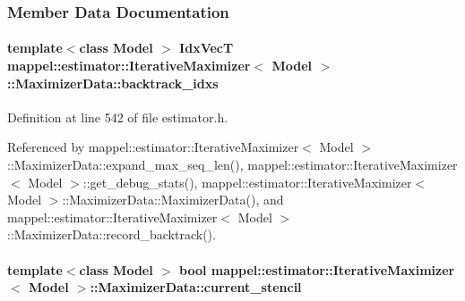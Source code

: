 \subsubsection{Member Data Documentation}
\paragraph[{\texorpdfstring{backtrack\+\_\+idxs}{backtrack_idxs}}]{\setlength{\rightskip}{0pt plus 5cm}template$<$class Model $>$ {\bf Idx\+VecT} {\bf mappel\+::estimator\+::\+Iterative\+Maximizer}$<$ Model $>$\+::Maximizer\+Data\+::backtrack\+\_\+idxs\hspace{0.3cm}{\ttfamily [protected]}}\hypertarget{classmappel_1_1estimator_1_1IterativeMaximizer_1_1MaximizerData_aa2e5e2e70dab82632a02aedfdb11f3fd}{}\label{classmappel_1_1estimator_1_1IterativeMaximizer_1_1MaximizerData_aa2e5e2e70dab82632a02aedfdb11f3fd}


Definition at line 542 of file estimator.\+h.



Referenced by mappel\+::estimator\+::\+Iterative\+Maximizer$<$ Model $>$\+::\+Maximizer\+Data\+::expand\+\_\+max\+\_\+seq\+\_\+len(), mappel\+::estimator\+::\+Iterative\+Maximizer$<$ Model $>$\+::get\+\_\+debug\+\_\+stats(), mappel\+::estimator\+::\+Iterative\+Maximizer$<$ Model $>$\+::\+Maximizer\+Data\+::\+Maximizer\+Data(), and mappel\+::estimator\+::\+Iterative\+Maximizer$<$ Model $>$\+::\+Maximizer\+Data\+::record\+\_\+backtrack().

\paragraph[{\texorpdfstring{current\+\_\+stencil}{current_stencil}}]{\setlength{\rightskip}{0pt plus 5cm}template$<$class Model $>$ bool {\bf mappel\+::estimator\+::\+Iterative\+Maximizer}$<$ Model $>$\+::Maximizer\+Data\+::current\+\_\+stencil\hspace{0.3cm}{\ttfamily [protected]}}\hypertarget{classmappel_1_1estimator_1_1IterativeMaximizer_1_1MaximizerData_a0f5328ef64b11fd94af32cc664efc4e4}{}\label{classmappel_1_1estimator_1_1IterativeMaximizer_1_1MaximizerData_a0f5328ef64b11fd94af32cc664efc4e4}


